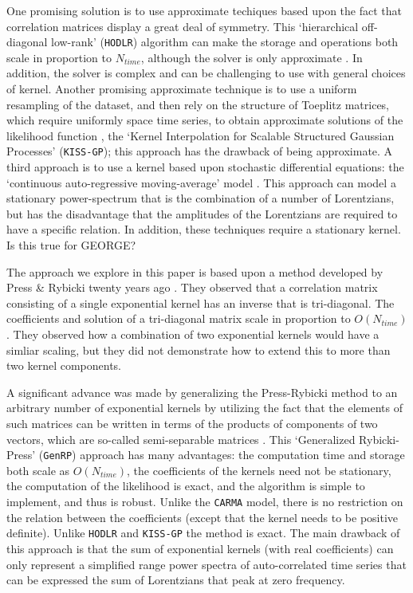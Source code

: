 \documentclass[manuscript, letterpaper]{aastex6}
\begin{document}
One promising solution is to use approximate techiques based upon the fact that correlation
matrices display a great deal of symmetry.  This `hierarchical off-diagonal low-rank' (\texttt{HODLR})
algorithm can make the storage and operations both scale in proportion to $N_{time}$, although the 
solver is only approximate \citep{Ambikasaran2013,Ambikasaran2016}.  In addition, the
solver is complex and can be challenging to use with general choices of kernel.  Another
promising approximate technique is to use a uniform resampling of the dataset, and then
rely on the structure of Toeplitz matrices, which require uniformly space time series,
to obtain approximate solutions of the likelihood function \citep{WilsonNickisch2015},
the `Kernel Interpolation for Scalable Structured Gaussian Processes' (\texttt{KISS-GP});
this approach has the drawback of being approximate.  A third approach is to use a kernel
based upon stochastic differential equations:  the `continuous auto-regressive moving-average'
model \citep[aka \texttt{CARMA};][]{Kelly2014}.  This approach can model a stationary power-spectrum that
is the combination of a number of Lorentzians, but has the disadvantage that the amplitudes
of the Lorentzians are required to have a specific relation.  In addition, these
techniques require a stationary kernel. {\color{red} Is this true for GEORGE?}

The approach we explore in this paper is based upon a method developed by Press \&
Rybicki twenty years ago \citep{1995PhRvL..74.1060R}.  They observed that a correlation
matrix consisting of a single exponential kernel has an inverse that is tri-diagonal.
The coefficients and solution of a tri-diagonal matrix scale in proportion to $O(N_{time})$.
They observed how a combination of two exponential kernels would have a simliar scaling,
but they did not demonstrate how to extend this to more than two kernel components.

A significant advance was made by generalizing the Press-Rybicki method to an
arbitrary number of exponential kernels by utilizing the fact that the elements of
such matrices can be written in terms of the products of components of two vectors,
which are so-called semi-separable matrices \citep{Ambikasaran2015}.  This `Generalized
Rybicki-Press' (\texttt{GenRP}) approach
has many advantages:  the computation time and storage both scale as $O(N_{time})$,
the coefficients of the kernels need not be stationary, the computation of the
likelihood is exact, and the algorithm is simple to implement, and thus is robust.
Unlike the \texttt{CARMA} model, there is no restriction on the relation between
the coefficients (except that the kernel needs to be positive definite).  Unlike
\texttt{HODLR} and \texttt{KISS-GP} the method is exact.  The main drawback of
this approach is that the sum of exponential kernels (with real coefficients) can 
only represent a simplified range power spectra of auto-correlated time series
that can be expressed the sum of Lorentzians that peak at zero frequency.
\end{document}

